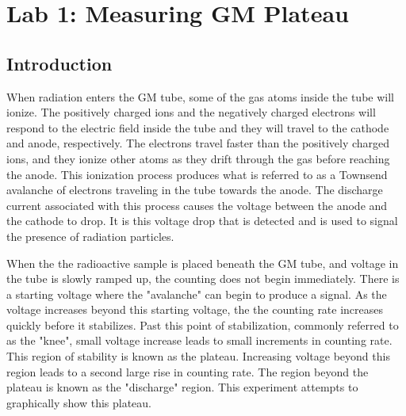 \documentclass[reprint,amsmath,amssymb,aps,prl]{revtex4-2}
\begin{document}
\section{Lab 1: Measuring GM Plateau}
\subsection{Introduction}
When radiation enters the GM tube, some of the gas atoms inside the tube will ionize. The positively charged ions and the negatively charged electrons will respond to the electric field inside the tube and they will travel to the cathode and anode, respectively. The electrons travel faster than the positively charged ions, and they ionize other atoms as they drift through the gas before reaching the anode. This ionization process produces what is referred to as a Townsend avalanche of electrons traveling in the tube towards the anode. The discharge current associated with this process causes the voltage between the anode and the cathode to drop. It is this voltage drop that is detected and is used to signal the presence of radiation particles. 

When the the radioactive sample is placed beneath the GM tube, and voltage in the tube is slowly ramped up, the counting does not begin immediately. There is a starting voltage where the "avalanche" can begin to produce a signal. As the voltage increases beyond this starting voltage, the the counting rate increases quickly before it stabilizes. Past this point of stabilization, commonly referred to as the "knee", small voltage increase leads to small increments in counting rate. This region of stability is known as the plateau. Increasing voltage beyond this region leads to a second large rise in counting rate. The region beyond the plateau is known as the "discharge" region. This experiment attempts to graphically show this plateau. 
\end{document}
